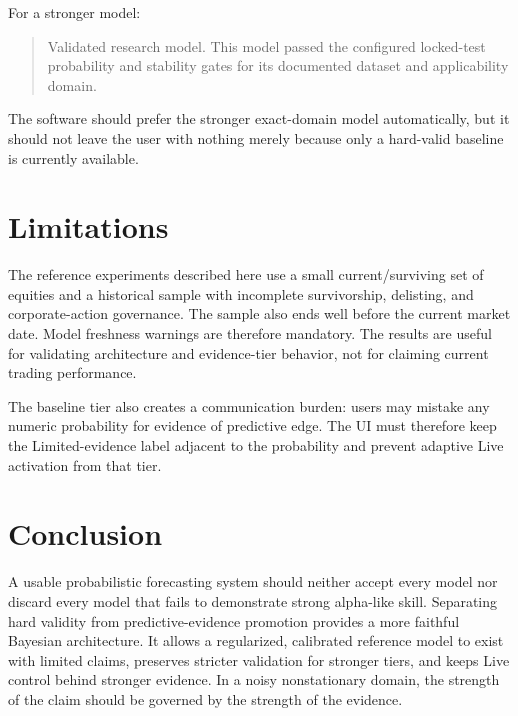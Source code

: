 \documentclass[11pt]{article}
\begin{document}
For a stronger model:
\begin{quote}
Validated research model. This model passed the configured locked-test probability and stability gates for its documented dataset and applicability domain.
\end{quote}

The software should prefer the stronger exact-domain model automatically, but it should not leave the user with nothing merely because only a hard-valid baseline is currently available.

\section{Limitations}
The reference experiments described here use a small current/surviving set of equities and a historical sample with incomplete survivorship, delisting, and corporate-action governance. The sample also ends well before the current market date. Model freshness warnings are therefore mandatory. The results are useful for validating architecture and evidence-tier behavior, not for claiming current trading performance.

The baseline tier also creates a communication burden: users may mistake any numeric probability for evidence of predictive edge. The UI must therefore keep the Limited-evidence label adjacent to the probability and prevent adaptive Live activation from that tier.

\section{Conclusion}
A usable probabilistic forecasting system should neither accept every model nor discard every model that fails to demonstrate strong alpha-like skill. Separating hard validity from predictive-evidence promotion provides a more faithful Bayesian architecture. It allows a regularized, calibrated reference model to exist with limited claims, preserves stricter validation for stronger tiers, and keeps Live control behind stronger evidence. In a noisy nonstationary domain, the strength of the claim should be governed by the strength of the evidence.



\end{document}

